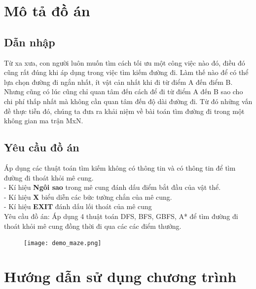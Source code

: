 \documentclass[11pt]{article} %
\begin{document}
\section{Mô tả đồ án}
\subsection{Dẫn nhập}
Từ xa xưa, con người luôn muốn tìm cách tối ưu một công việc nào đó, điều đó cũng rất đúng khi áp dụng trong việc tìm kiếm đường đi. Làm thế nào để có thể lựa chọn đường đi ngắn nhất, ít vật cản nhất khi đi từ điểm A đến điểm B. Nhưng cũng có lúc cũng chỉ quan tâm đến cách để đi từ điểm A đến B sao cho chi phí thấp nhất mà không cần quan tâm đến độ dài đường đi. Từ đó những vấn đề thực tiễn đó, chúng ta đưa ra khải niệm về bài toán tìm đường đi trong một không gian ma trận MxN.
\subsection{Yêu cầu đồ án} \cite{slide}
 Áp dụng các thuật toán tìm kiếm không có thông tin và có thông tin để tìm đường đi thoát khỏi mê cung. 
\\- Kí hiệu \textbf{Ngôi sao} trong mê cung đánh dấu điểm bắt đầu của vật thể. 
\\- Kí hiệu \textbf{X} biểu diễn các bức tường chắn của mê cung.
\\- Kí hiệu \textbf{EXIT} đánh dấu lối thoát của mê cung
\\Yêu cầu đồ án: Áp dụng 4 thuật toán DFS, BFS, GBFS, A* để tìm đường đi thoát khỏi mê cung đồng thời đi qua các các điểm thưởng.
\begin{figure}[h] %
	\centering
	\texttt{[image: demo\_maze.png]} %
\end{figure}
\section{Hướng dẫn sử dụng chương trình}
\end{document}
